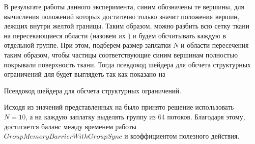 	В результате работы данного эксперимента, синим обозначены те вершины, для вычисления положений которых достаточно только значит положения вершин, лежщих внутри желтой границы. Таким образом, можно разбить всю сетку ткани на пересекающиеся области (назовем их ) и будем обсчитывать каждую  в отдельной группе. При этом, подберем размер заплатки $N$ и области пересечения таким образом, чтобы частицы соответствующие синим вершинам полностью покрывали поверхность ткани. Тогда псевдокод шейдера для обсчета структурных ограничений для  будет выглядеть так как показано на 
	
	\begin{algorithm} [h]
		\nonl{}
	\caption{Псевдокод шейдера для обсчета структурных ограничений.}\label{alg:structuralChunk}
	\end{algorithm}
	
	Исходя из значений представленных на  было принято решение использовать $N=10$, а на каждую заплатку выделять группу из 64 потоков. Благодаря этому, достигается баланс между временем работы $GroupMemoryBarrierWithGroupSync$ и коэффициентом полезного действия.
	
